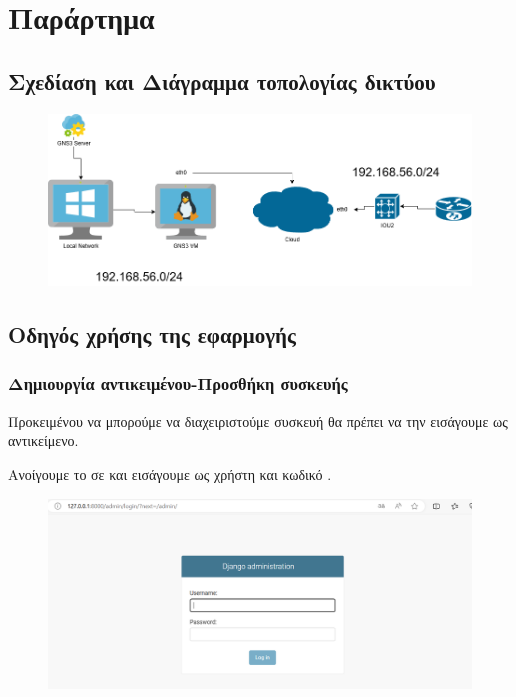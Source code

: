 
\chapter{Παράρτημα}

\section{Σχεδίαση και Διάγραμμα τοπολογίας δικτύου}

\FloatBarrier

\begin{figure}[h]
	\centering
	\includegraphics[width=1.1\textwidth]{graphics/network_topology_high_level.png}
	\caption{}
\end{figure}

\FloatBarrier

\section{Οδηγός χρήσης της εφαρμογής}

\subsection{Δημιουργία αντικειμένου-Προσθήκη συσκευής}

Προκειμένου να μπορούμε να διαχειριστούμε συσκευή θα πρέπει να την εισάγουμε ως αντικείμενο.

Ανοίγουμε το  σε  και εισάγουμε ως χρήστη 
και κωδικό .

\FloatBarrier

\begin{figure}[h]
	\centering
	\includegraphics[width=1.1\textwidth]{graphics/GUI_LOGIN.png}
	\caption{}
\end{figure}

